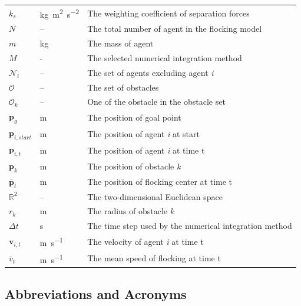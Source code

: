 \documentclass[12pt]{article}
\begin{document}
\begin{longtable*}{l l p{12cm}}
$k_s$  & \si{\kilogram\metre\squared\per\second\squared} & The weighting coefficient of separation forces \\
$N$ & -- & The total number of agent in the flocking model \\
$m$ & \si{\kilogram} & The mass of agent \\
$M$ & - & The selected numerical integration method \\
$\mathcal{N}_i$ & -- & The set of agents excluding agent \textit{i} \\
$\mathcal{O}$ & -- & The set of obstacles \\
$\mathcal{O}_k$ & -- & One of the obstacle in the obstacle set \\
$\mathbf{p}_{g}$ & \si{\metre} & The position of goal point \\
$\mathbf{p}_{i,start}$ & \si{\metre} & The position of agent \textit{i} at start\\
$\mathbf{p}_{i,t}$ & \si{\metre} & The position of agent \textit{i} at time t\\
$\mathbf{p}_{k}$ & \si{\metre} & The position of obstacle \textit{k} \\
$\bar{\mathbf{p}}_t$ & \si{\metre} & The position of flocking center at time t \\
$\mathbb{R}^2$ & -- & The two-dimensional Euclidean space \\
$r_k$ & \si{\metre} & The radius of obstacle \textit{k} \\
$\Delta t$ & \si{\second} & The time step used by the numerical integration method \\
$\mathbf{v}_{i,t}$ & \si{\metre\per\second} & The velocity of agent \textit{i} at time t\\
$\bar{v}_t$ & \si{\metre\per\second} & The mean speed of flocking at time t\\
\bottomrule
\end{longtable*}

\subsection{Abbreviations and Acronyms}
\end{document}
